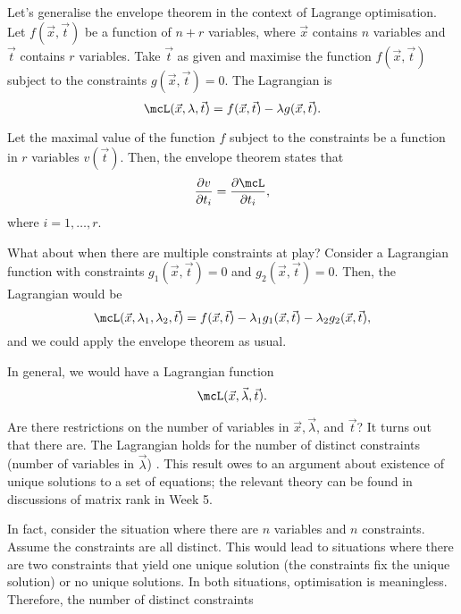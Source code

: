 \documentclass[a4paper, 12pt,oneside,openany]{book}
\begin{document}
Let's generalise the envelope theorem in the context of Lagrange optimisation. Let $f(\vec{x}, \vec{t})$ be a function of $n+r$ variables, where $\vec{x}$ contains $n$ variables and $\vec{t}$ contains $r$ variables. Take $\vec{t}$ as given and maximise the function $f(\vec{x}, \vec{t})$ subject to the constraints $g(\vec{x}, \vec{t})=0$. The Lagrangian is $$\mcL(\vec{x}, \lambda, \vec{t}) = f(\vec{x}, \vec{t})-\lambda g(\vec{x}, \vec{t}).$$ 

Let the maximal value of the function $f$ subject to the constraints be a function in $r$ variables $v(\vec{t})$. Then, the envelope theorem states that $$\frac{\partial v}{\partial t_i} = \frac{\partial \mcL}{\partial t_i},$$ where $i=1, \dots, r$. 


What about when there are multiple constraints at play? Consider a Lagrangian function with constraints $g_1(\vec{x}, \vec{t})=0$ and $g_2(\vec{x}, \vec{t})=0$. Then, the Lagrangian would be $$\mcL(\vec{x}, \lambda_1, \lambda_2, \vec{t}) = f(\vec{x}, \vec{t}) - \lambda_1 g_1(\vec{x}, \vec{t}) - \lambda_2 g_2(\vec{x}, \vec{t}),$$ and we could apply the envelope theorem as usual.

In general, we would have a Lagrangian function $$\mcL(\vec{x}, \vec{\lambda}, \vec{t}).$$  

Are there restrictions on the number of variables in $\vec{x}, \vec{\lambda}$, and $\vec{t}$? It turns out that there are. The Lagrangian holds for the number of distinct constraints (number of variables in $\vec{\lambda}$) . This result owes to an argument about existence of unique solutions to a set of equations; the relevant theory can be found in discussions of matrix rank in Week 5.

In fact, consider the situation where there are $n$ variables and $n$ constraints. Assume the constraints are all distinct. This would lead to situations where there are two constraints that yield one unique solution (the constraints fix the unique solution) or no unique solutions. In both situations, optimisation is meaningless. Therefore, the number of distinct constraints 
\end{document}
